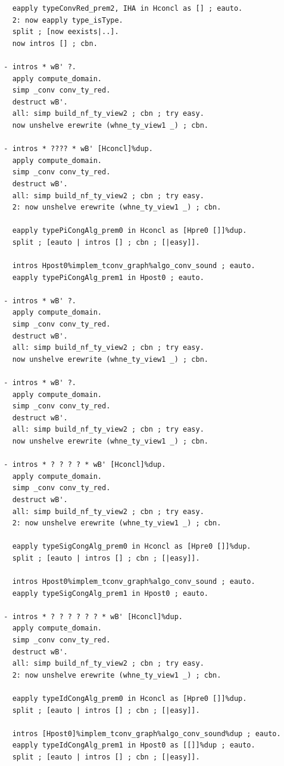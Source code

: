 \begin{lstlisting}
    eapply typeConvRed_prem2, IHA in Hconcl as [] ; eauto.
    2: now eapply type_isType.
    split ; [now eexists|..].
    now intros [] ; cbn.

  - intros * wB' ?.
    apply compute_domain.
    simp _conv conv_ty_red.
    destruct wB'.
    all: simp build_nf_ty_view2 ; cbn ; try easy.
    now unshelve erewrite (whne_ty_view1 _) ; cbn.

  - intros * ???? * wB' [Hconcl]%dup.
    apply compute_domain.
    simp _conv conv_ty_red.
    destruct wB'.
    all: simp build_nf_ty_view2 ; cbn ; try easy.
    2: now unshelve erewrite (whne_ty_view1 _) ; cbn.
    
    eapply typePiCongAlg_prem0 in Hconcl as [Hpre0 []]%dup.
    split ; [eauto | intros [] ; cbn ; [|easy]].

    intros Hpost0%implem_tconv_graph%algo_conv_sound ; eauto.
    eapply typePiCongAlg_prem1 in Hpost0 ; eauto.

  - intros * wB' ?.
    apply compute_domain.
    simp _conv conv_ty_red.
    destruct wB'.
    all: simp build_nf_ty_view2 ; cbn ; try easy.
    now unshelve erewrite (whne_ty_view1 _) ; cbn.
  
  - intros * wB' ?.
    apply compute_domain.
    simp _conv conv_ty_red.
    destruct wB'.
    all: simp build_nf_ty_view2 ; cbn ; try easy.
    now unshelve erewrite (whne_ty_view1 _) ; cbn.

  - intros * ? ? ? ? * wB' [Hconcl]%dup.
    apply compute_domain.
    simp _conv conv_ty_red.
    destruct wB'.
    all: simp build_nf_ty_view2 ; cbn ; try easy.
    2: now unshelve erewrite (whne_ty_view1 _) ; cbn.
    
    eapply typeSigCongAlg_prem0 in Hconcl as [Hpre0 []]%dup.
    split ; [eauto | intros [] ; cbn ; [|easy]].

    intros Hpost0%implem_tconv_graph%algo_conv_sound ; eauto.
    eapply typeSigCongAlg_prem1 in Hpost0 ; eauto.

  - intros * ? ? ? ? ? ? * wB' [Hconcl]%dup.
    apply compute_domain.
    simp _conv conv_ty_red.
    destruct wB'.
    all: simp build_nf_ty_view2 ; cbn ; try easy.
    2: now unshelve erewrite (whne_ty_view1 _) ; cbn.

    eapply typeIdCongAlg_prem0 in Hconcl as [Hpre0 []]%dup.
    split ; [eauto | intros [] ; cbn ; [|easy]].

    intros [Hpost0]%implem_tconv_graph%algo_conv_sound%dup ; eauto.
    eapply typeIdCongAlg_prem1 in Hpost0 as [[]]%dup ; eauto.
    split ; [eauto | intros [] ; cbn ; [|easy]].


\end{lstlisting}
